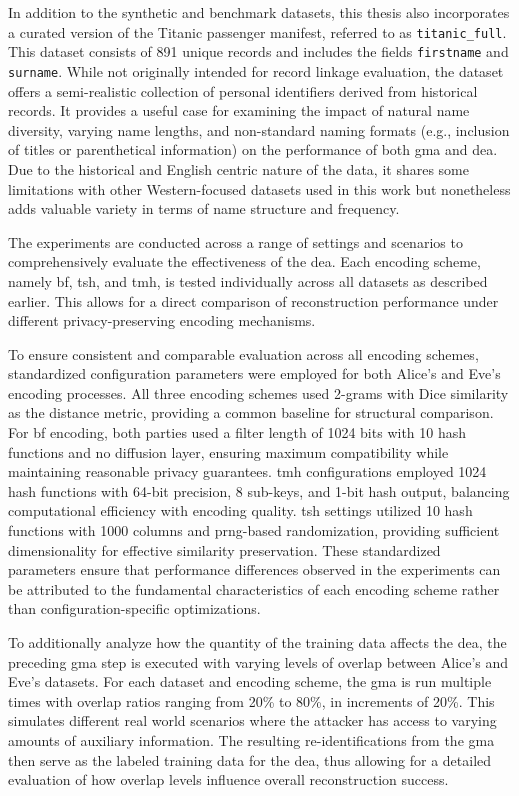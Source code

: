 In addition to the synthetic and benchmark datasets, this thesis also incorporates a curated version of the Titanic passenger manifest, referred to as \texttt{titanic\_full}.
This dataset consists of 891 unique records and includes the fields \texttt{firstname} and \texttt{surname}.
While not originally intended for record linkage evaluation, the dataset offers a semi-realistic collection of personal identifiers derived from historical records.
It provides a useful case for examining the impact of natural name diversity, varying name lengths, and non-standard naming formats (e.g., inclusion of titles or parenthetical information) on the performance of both \ac{gma} and \ac{dea}.
Due to the historical and English centric nature of the data, it shares some limitations with other Western-focused datasets used in this work but nonetheless adds valuable variety in terms of name structure and frequency.

The experiments are conducted across a range of settings and scenarios to comprehensively evaluate the effectiveness of the \ac{dea}.
Each encoding scheme, namely \ac{bf}, \ac{tsh}, and \ac{tmh}, is tested individually across all datasets as described earlier.
This allows for a direct comparison of reconstruction performance under different privacy-preserving encoding mechanisms.

To ensure consistent and comparable evaluation across all encoding schemes, standardized configuration parameters were employed for both Alice's and Eve's encoding processes.
All three encoding schemes used 2-grams with Dice similarity as the distance metric, providing a common baseline for structural comparison.
For \ac{bf} encoding, both parties used a filter length of 1024 bits with 10 hash functions and no diffusion layer, ensuring maximum compatibility while maintaining reasonable privacy guarantees.
\ac{tmh} configurations employed 1024 hash functions with 64-bit precision, 8 sub-keys, and 1-bit hash output, balancing computational efficiency with encoding quality.
\ac{tsh} settings utilized 10 hash functions with 1000 columns and \ac{prng}-based randomization, providing sufficient dimensionality for effective similarity preservation.
These standardized parameters ensure that performance differences observed in the experiments can be attributed to the fundamental characteristics of each encoding scheme rather than configuration-specific optimizations.

To additionally analyze how the quantity of the training data affects the \ac{dea}, the preceding \ac{gma} step is executed with varying levels of overlap between Alice's and Eve's datasets.
For each dataset and encoding scheme, the \ac{gma} is run multiple times with overlap ratios ranging from 20\% to 80\%, in increments of 20\%.
This simulates different real world scenarios where the attacker has access to varying amounts of auxiliary information.
The resulting re-identifications from the \ac{gma} then serve as the labeled training data for the \ac{dea}, thus allowing for a detailed evaluation of how overlap levels influence overall reconstruction success.

